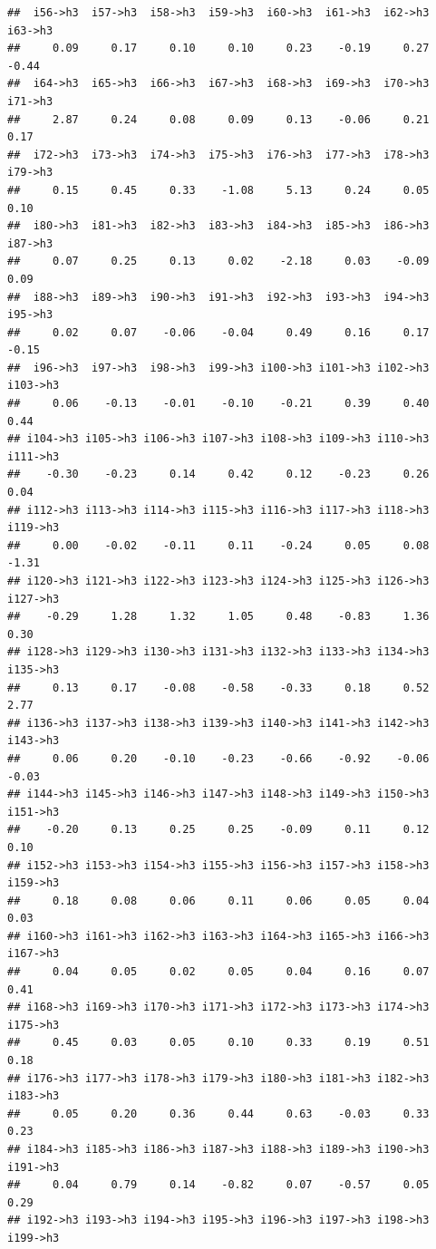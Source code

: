 \documentclass[
]{article}
\begin{document}
\begin{verbatim}
##  i56->h3  i57->h3  i58->h3  i59->h3  i60->h3  i61->h3  i62->h3  i63->h3 
##     0.09     0.17     0.10     0.10     0.23    -0.19     0.27    -0.44 
##  i64->h3  i65->h3  i66->h3  i67->h3  i68->h3  i69->h3  i70->h3  i71->h3 
##     2.87     0.24     0.08     0.09     0.13    -0.06     0.21     0.17 
##  i72->h3  i73->h3  i74->h3  i75->h3  i76->h3  i77->h3  i78->h3  i79->h3 
##     0.15     0.45     0.33    -1.08     5.13     0.24     0.05     0.10 
##  i80->h3  i81->h3  i82->h3  i83->h3  i84->h3  i85->h3  i86->h3  i87->h3 
##     0.07     0.25     0.13     0.02    -2.18     0.03    -0.09     0.09 
##  i88->h3  i89->h3  i90->h3  i91->h3  i92->h3  i93->h3  i94->h3  i95->h3 
##     0.02     0.07    -0.06    -0.04     0.49     0.16     0.17    -0.15 
##  i96->h3  i97->h3  i98->h3  i99->h3 i100->h3 i101->h3 i102->h3 i103->h3 
##     0.06    -0.13    -0.01    -0.10    -0.21     0.39     0.40     0.44 
## i104->h3 i105->h3 i106->h3 i107->h3 i108->h3 i109->h3 i110->h3 i111->h3 
##    -0.30    -0.23     0.14     0.42     0.12    -0.23     0.26     0.04 
## i112->h3 i113->h3 i114->h3 i115->h3 i116->h3 i117->h3 i118->h3 i119->h3 
##     0.00    -0.02    -0.11     0.11    -0.24     0.05     0.08    -1.31 
## i120->h3 i121->h3 i122->h3 i123->h3 i124->h3 i125->h3 i126->h3 i127->h3 
##    -0.29     1.28     1.32     1.05     0.48    -0.83     1.36     0.30 
## i128->h3 i129->h3 i130->h3 i131->h3 i132->h3 i133->h3 i134->h3 i135->h3 
##     0.13     0.17    -0.08    -0.58    -0.33     0.18     0.52     2.77 
## i136->h3 i137->h3 i138->h3 i139->h3 i140->h3 i141->h3 i142->h3 i143->h3 
##     0.06     0.20    -0.10    -0.23    -0.66    -0.92    -0.06    -0.03 
## i144->h3 i145->h3 i146->h3 i147->h3 i148->h3 i149->h3 i150->h3 i151->h3 
##    -0.20     0.13     0.25     0.25    -0.09     0.11     0.12     0.10 
## i152->h3 i153->h3 i154->h3 i155->h3 i156->h3 i157->h3 i158->h3 i159->h3 
##     0.18     0.08     0.06     0.11     0.06     0.05     0.04     0.03 
## i160->h3 i161->h3 i162->h3 i163->h3 i164->h3 i165->h3 i166->h3 i167->h3 
##     0.04     0.05     0.02     0.05     0.04     0.16     0.07     0.41 
## i168->h3 i169->h3 i170->h3 i171->h3 i172->h3 i173->h3 i174->h3 i175->h3 
##     0.45     0.03     0.05     0.10     0.33     0.19     0.51     0.18 
## i176->h3 i177->h3 i178->h3 i179->h3 i180->h3 i181->h3 i182->h3 i183->h3 
##     0.05     0.20     0.36     0.44     0.63    -0.03     0.33     0.23 
## i184->h3 i185->h3 i186->h3 i187->h3 i188->h3 i189->h3 i190->h3 i191->h3 
##     0.04     0.79     0.14    -0.82     0.07    -0.57     0.05     0.29 
## i192->h3 i193->h3 i194->h3 i195->h3 i196->h3 i197->h3 i198->h3 i199->h3 

\end{verbatim}
\end{document}
